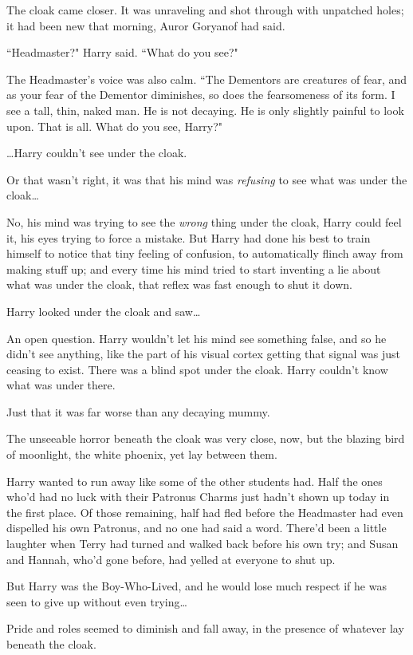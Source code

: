 The cloak came closer. It was unraveling and shot through with unpatched holes; it had been new that morning, Auror Goryanof had said.

``Headmaster?" Harry said. ``What do you see?"

The Headmaster's voice was also calm. ``The Dementors are creatures of fear, and as your fear of the Dementor diminishes, so does the fearsomeness of its form. I see a tall, thin, naked man. He is not decaying. He is only slightly painful to look upon. That is all. What do you see, Harry?"

{\ldots}Harry couldn't see under the cloak.

Or that wasn't right, it was that his mind was \emph{refusing} to see what was under the cloak{\ldots}

No, his mind was trying to see the \emph{wrong} thing under the cloak, Harry could feel it, his eyes trying to force a mistake. But Harry had done his best to train himself to notice that tiny feeling of confusion, to automatically flinch away from making stuff up; and every time his mind tried to start inventing a lie about what was under the cloak, that reflex was fast enough to shut it down.

Harry looked under the cloak and saw{\ldots}

An open question. Harry wouldn't let his mind see something false, and so he didn't see anything, like the part of his visual cortex getting that signal was just ceasing to exist. There was a blind spot under the cloak. Harry couldn't know what was under there.

Just that it was far worse than any decaying mummy.

The unseeable horror beneath the cloak was very close, now, but the blazing bird of moonlight, the white phoenix, yet lay between them.

Harry wanted to run away like some of the other students had. Half the ones who'd had no luck with their Patronus Charms just hadn't shown up today in the first place. Of those remaining, half had fled before the Headmaster had even dispelled his own Patronus, and no one had said a word. There'd been a little laughter when Terry had turned and walked back before his own try; and Susan and Hannah, who'd gone before, had yelled at everyone to shut up.

But Harry was the Boy-Who-Lived, and he would lose much respect if he was seen to give up without even trying{\ldots}

Pride and roles seemed to diminish and fall away, in the presence of whatever lay beneath the cloak.

